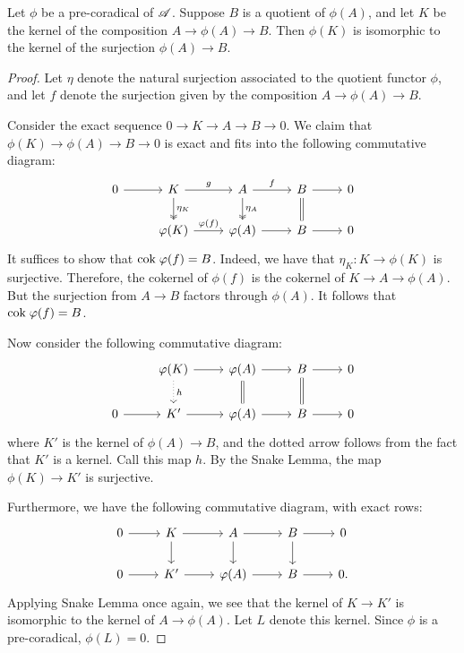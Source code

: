 \begin{prop}
Let $\phi$ be a pre-coradical of $\mathscr{A}$. Suppose $B$ is a 
quotient of $\phi(A)$, and let $K$ be the kernel of the 
composition $A \to \phi(A) \to B$. Then $\phi(K)$ is isomorphic 
to the kernel of the surjection $\phi(A) \to B$.
\end{prop}
\begin{proof}
Let $\eta$ denote the natural surjection associated to the 
quotient functor $\phi$, and let $f$ denote the surjection given 
by the composition $A \to \phi(A) \to B$.

Consider the exact sequence $0 \to K \to A \to B \to 0$. We claim
that $\phi(K) \to \phi(A) \to B \to 0$ is exact and fits into the 
following commutative diagram:
\[
\begin{tikzcd}
0 \arrow{r} &
K \arrow{r}{g} \arrow[twoheadrightarrow]{d}{\eta_K} &
A \arrow{r}{f} \arrow[twoheadrightarrow]{d}{\eta_A} &
B \arrow{r} \arrow[equal]{d} &
0 \\
& \phi(K) \arrow{r}{\phi(f)} &
\phi(A) \arrow{r} &
B \arrow{r} &
0
\end{tikzcd}
\]
It suffices to show that $\mathrm{cok}\; \varphi(f) = B$. Indeed, we have
that $\eta_K: K \to \phi(K)$ is surjective. Therefore, the
cokernel of $\phi(f)$ is the cokernel of $K \to A \to \phi(A)$.
But the surjection from $A \to B$ factors through $\phi(A)$. It 
follows that $\mathrm{cok}\; \varphi(f) = B$.

Now consider the following commutative diagram:
\[
\begin{tikzcd}
{}
&\phi(K) \arrow{r} \arrow[dotted]{d}{h}
&\phi(A) \arrow{r} \arrow[equals]{d}
&B \arrow{r} \arrow[equals]{d}
&0\\
0 \arrow{r}
& K' \arrow{r}
&\phi(A) \arrow{r}
&B \arrow{r}
&0
\end{tikzcd}
\]
where $K'$ is the kernel of $\phi(A) \to B$, and the dotted arrow
follows from the fact that $K'$ is a kernel. Call this map $h$. 
By the Snake Lemma, the map $\phi(K) \to K'$ is surjective.

Furthermore, we have the following commutative diagram, with
exact rows:
\[
\begin{tikzcd}
0 \arrow{r} &
K \arrow{r} \arrow{d} &
A \arrow{r} \arrow{d} &
B \arrow{r} \arrow{d} &
0 \\
0 \arrow{r} &
K' \arrow{r} &
\phi(A) \arrow{r} &
B \arrow{r} &
0.
\end{tikzcd}
\]
Applying Snake Lemma once again, we see that the kernel of $K \to 
K'$ is isomorphic to the kernel of $A \to \phi(A)$. Let $L$ denote
this kernel. Since $\phi$ is a pre-coradical, $\phi(L) = 0$.


\end{proof}
